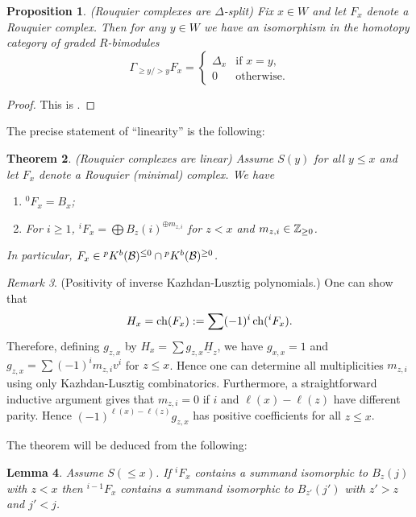 \documentclass[11pt]{amsart}
\numberwithin{equation}{section}
\def\un{\underline}
\newtheorem{thm}{Theorem}[section]
\newtheorem{lem}[thm]{Lemma}
\newtheorem{prop}[thm]{Proposition}
\theoremstyle{definition}
\theoremstyle{remark}
\newtheorem{remark}[thm]{Remark}
\begin{document}
{\begin{prop} \label{prop:delta split} (Rouquier complexes are
  $\Delta$-split) Fix $x \in W$ and let $F_x$ denote a Rouquier complex. Then for any $y \in W$ we have an
isomorphism in the homotopy category of graded $R$-bimodules \[
\Gamma_{\ge y / > y} F_x = \begin{cases} \Delta_x & \text{if $x = y$,}
  \\ 0 & \text{otherwise.} \end{cases} \] \end{prop}

\begin{proof} This is \cite[Proposition 3.7]{LW}. \end{proof}

The precise statement of ``linearity'' is the following:

\begin{thm} (Rouquier complexes are linear) \label{thm:rouquier
    linear} Assume $S(y)$ for all $y \le x$ and let
  $F_x$ denote a Rouquier (minimal) complex. We have
  \begin{enumerate}
  \item ${}^0F_x = B_x$;
  \item For $i \ge 1$, ${}^iF_x= \bigoplus B_z(i)^{\oplus m_{z,i}}$ for $z < x$ and $m_{z,i} \in {\mathbb{Z}}_{\ge 0}$.
  \end{enumerate}
In particular, $F_x \in {}^p K^b({\mathcal{B}})^{\le 0} \cap {}^p K^b({\mathcal{B}})^{\ge 0}$.
\end{thm}

\begin{remark}(Positivity of inverse Kazhdan-Lusztig polynomials.) One
  can show that 
\[ H_x = \operatorname{ch}(F_x) := \sum (-1)^i \operatorname{ch}({}^iF_x). \]
Therefore, defining $g_{z,x}$ by $H_x =
\sum g_{z,x} \un{H}_z$, we have $g_{x,x} = 1$ and $g_{z,x} = \sum (-1)^i m_{z,i} v^i$ for $z \le x$. Hence one can determine all multiplicities $m_{z,i}$ using only Kazhdan-Lusztig
combinatorics. Furthermore, a straightforward inductive argument gives
that $m_{z,i} = 0$ if $i$ and $\ell(x) - \ell(z)$ have different parity. Hence $(-1)^{\ell(x)-\ell(z)}g_{z,x}$ has positive
coefficients for all $z \le x$.
 \end{remark}

The theorem will be deduced from the following:

\begin{lem} \label{lem:delta induction} Assume $S(\le\!x)$. If ${}^iF_x$ contains a summand
  isomorphic to $B_z(j)$ with $z < x$ then ${}^{i-1}F_x$ contains a summand isomorphic to $B_{z'}(j')$ with $z'>z$ and
$j' < j$.\end{lem}

}
\end{document}
